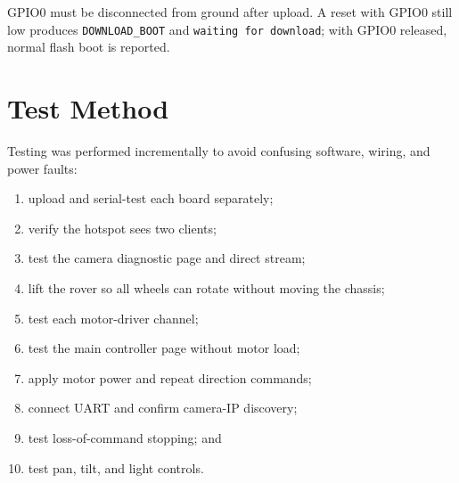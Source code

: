 \documentclass[12pt,a4paper,oneside]{report}
\newcommand{\code}[1]{\texttt{#1}}
\begin{document}
GPIO0 must be disconnected from ground after upload. A reset with GPIO0 still
low produces \code{DOWNLOAD\_BOOT} and \code{waiting for download}; with GPIO0
released, normal flash boot is reported.

\section{Test Method}
Testing was performed incrementally to avoid confusing software, wiring, and
power faults:

\begin{enumerate}
  \item upload and serial-test each board separately;
  \item verify the hotspot sees two clients;
  \item test the camera diagnostic page and direct stream;
  \item lift the rover so all wheels can rotate without moving the chassis;
  \item test each motor-driver channel;
  \item test the main controller page without motor load;
  \item apply motor power and repeat direction commands;
  \item connect UART and confirm camera-IP discovery;
  \item test loss-of-command stopping; and
  \item test pan, tilt, and light controls.
\end{enumerate}
\end{document}
